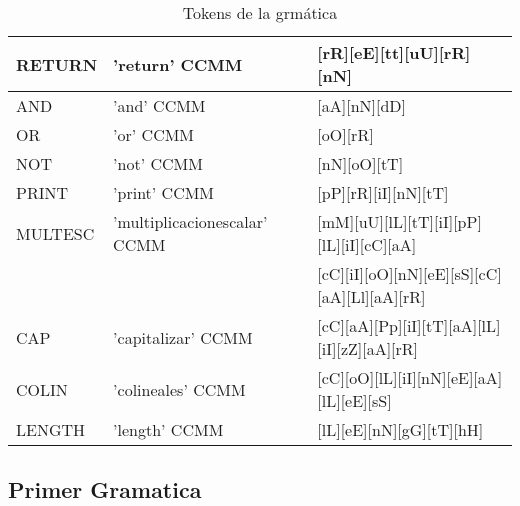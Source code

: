 \begin{table}[!htb]
\begin{center}
\begin{tabular}{| l | l | l |}
\hline
RETURN & 'return' CCMM & [rR][eE][tt][uU][rR][nN] \\
\hline
AND & 'and' CCMM & [aA][nN][dD] \\
\hline
OR & 'or' CCMM & [oO][rR] \\
\hline
NOT 	& 'not' CCMM & [nN][oO][tT] \\
\hline
PRINT & 'print' CCMM & [pP][rR][iI][nN][tT] \\
\hline
MULTESC & 'multiplicacionescalar' CCMM & [mM][uU][lL][tT][iI][pP][lL][iI][cC][aA] \\
 & & [cC][iI][oO][nN][eE][sS][cC][aA][Ll][aA][rR] \\
\hline
CAP & 'capitalizar' CCMM & [cC][aA][Pp][iI][tT][aA][lL][iI][zZ][aA][rR] \\
\hline
COLIN & 'colineales' CCMM & [cC][oO][lL][iI][nN][eE][aA][lL][eE][sS] \\
\hline
LENGTH & 'length' CCMM & [lL][eE][nN][gG][tT][hH] \\
\hline

\end{tabular}
\end{center}
\caption{Tokens de la grmática}\label{tab-tokens}
\end{table}


\newpage

\subsection{Primer Gramatica}


